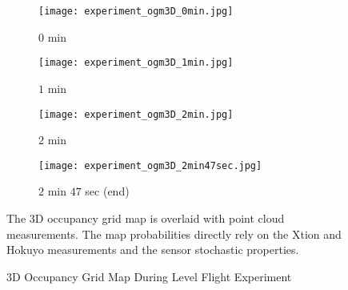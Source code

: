 
\begin{figure}[!t]
\centering
    	\begin{subfigure}[t]{0.65\columnwidth}
           	\centering
          	\texttt{[image: experiment\_ogm3D\_0min.jpg]}
        		\caption{$0$ min}
    	\end{subfigure}
    	\begin{subfigure}[t]{0.65\columnwidth}
		\vspace*{0.01\columnwidth}
           	\centering
          	\texttt{[image: experiment\_ogm3D\_1min.jpg]}
        		\caption{$1$ min}
    	\end{subfigure}
    	\begin{subfigure}[t]{0.65\columnwidth}
	\vspace*{0.01\columnwidth}
           	\centering
          	\texttt{[image: experiment\_ogm3D\_2min.jpg]}
        		\caption{$2$ min}
    	\end{subfigure}
    	\begin{subfigure}[t]{0.65\columnwidth}
	\vspace*{0.01\columnwidth}
           	\centering
          	\texttt{[image: experiment\_ogm3D\_2min47sec.jpg]}
        		\caption{$2$ min $47$ sec (end)}
    	\end{subfigure}
	\caption{3D Occupancy Grid Map During Level Flight Experiment}
	\medskip
	\small
	The 3D occupancy grid map is overlaid with point cloud measurements. The map probabilities directly rely on the Xtion and Hokuyo measurements and the sensor stochastic properties.
	\label{fig:exp3DMap}
\end{figure}

